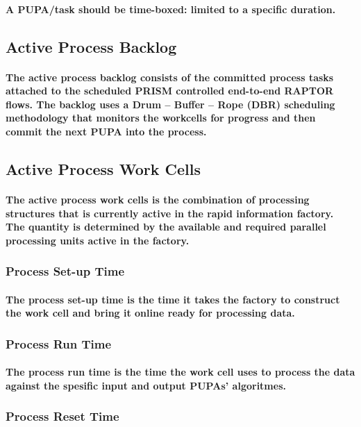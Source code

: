 \paragraph{A PUPA/task should be time-boxed: limited to a specific duration.}
\subsection{\textbf{Active Process Backlog}}
\paragraph{The active process backlog consists of the committed process tasks attached to the scheduled PRISM controlled end-to-end RAPTOR flows. The backlog uses a Drum – Buffer – Rope (DBR) scheduling methodology \cite{daniel1997scheduling} that monitors the workcells for progress and then commit the next PUPA into the process.}
\subsection{\textbf{Active Process Work Cells}}
\paragraph{The active process work cells is the combination of processing structures that is currently active in the rapid information factory. The quantity is determined by the available and required parallel processing units active in the factory.}
\subsubsection{\textbf{Process Set-up Time}}
\paragraph{The process set-up time is the time it takes the factory to construct the work cell and bring it online ready for processing data.}
\subsubsection{\textbf{Process Run Time}}
\paragraph{The process run time is the time the work cell uses to process the data against the spesific input and output PUPAs' algoritmes.}
\subsubsection{\textbf{Process Reset Time}}
